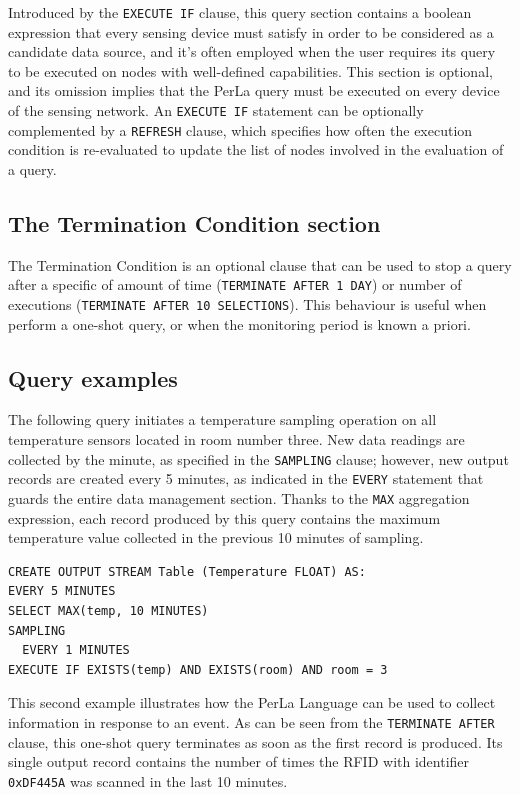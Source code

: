 Introduced by the \texttt{EXECUTE IF} clause, this query section contains a
boolean expression that every sensing device must satisfy in order to be
considered as a candidate data source, and it's often employed when the user
requires its query to be executed on nodes with well-defined capabilities. This
section is optional, and its omission implies that the PerLa query must be
executed on every device of the sensing network. An \texttt{EXECUTE IF}
statement can be optionally complemented by a \texttt{REFRESH} clause, which
specifies how often the execution condition is re-evaluated to update the list
of nodes involved in the evaluation of a query. 

\subsection{The Termination Condition section}

The Termination Condition is an optional clause that can be used to stop a
query after a specific of amount of time (\lstinline!TERMINATE AFTER 1 DAY!) or
number of executions (\lstinline!TERMINATE AFTER 10 SELECTIONS!). This
behaviour is useful when perform a one-shot query, or when the monitoring
period is known a priori.

\subsection{Query examples}

The following query initiates a temperature sampling operation on all
temperature sensors located in room number three. New data readings are
collected by the minute, as specified in the \texttt{SAMPLING} clause; however,
new output records are created every 5 minutes, as indicated in the
\texttt{EVERY} statement that guards the entire data management section. Thanks
to the \texttt{MAX} aggregation expression, each record produced by this query
contains the maximum temperature value collected in the previous 10 minutes of
sampling.

\begin{lstlisting}
CREATE OUTPUT STREAM Table (Temperature FLOAT) AS:
EVERY 5 MINUTES
SELECT MAX(temp, 10 MINUTES)
SAMPLING
  EVERY 1 MINUTES
EXECUTE IF EXISTS(temp) AND EXISTS(room) AND room = 3
\end{lstlisting}


This second example illustrates how the PerLa Language can be used to collect
information in response to an event. As can be seen from the \texttt{TERMINATE
AFTER} clause, this one-shot query terminates as soon as the first record is
produced. Its single output record contains the number of times the RFID with
identifier \texttt{0xDF445A} was scanned in the last 10 minutes.

